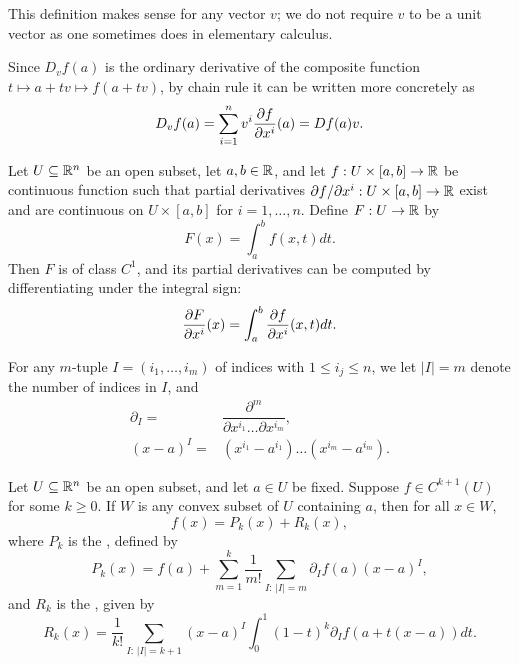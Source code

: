 \documentclass[11pt,a4paper]{article}
\begin{document}
\begin{remark}
This definition makes sense for any vector $v$; we do not require $v$ to be a unit vector as one sometimes does in elementary calculus.
\end{remark}

\begin{remark}
Since $D_vf(a)$ is the ordinary derivative of the composite function $t\mapsto a+tv\mapsto f(a+tv)$, by chain rule it can be written more concretely as
\begin{equation*}
D_vf(a) = \sum_{i=1}^n v^i \dfrac{\partial f}{\partial x^{i}}(a) = Df(a)v.
\end{equation*}
\end{remark}

\begin{proposition} \label{prop:fundamental_theorem_of_calculus}
Let $U\subseteq\mathbb{R}^n$ be an open subset, let $a,b\in \mathbb{R}$, and let $f:U\times[a,b]\rightarrow \mathbb{R}$ be continuous function such that partial derivatives $\partial f/\partial x^{i}:U\times[a,b]\rightarrow \mathbb{R}$ exist and are continuous on $U\times [a,b]$ for $i = 1,\ldots,n$. Define $F:U\rightarrow \mathbb{R}$ by
\begin{equation*}
F(x) = \int_{a}^b f(x,t)dt.
\end{equation*}
Then $F$ is of class $C^1$, and its partial derivatives can be computed by differentiating under the integral sign:
\begin{equation*}
\dfrac{\partial F}{\partial x^{i}}(x) = \int_a^b \dfrac{\partial f}{\partial x^{i}}(x,t) dt.
\end{equation*}
\end{proposition}

For any $m$-tuple $I = (i_1,\ldots,i_m)$ of indices with $1\le i_j\le n$, we let $|I| = m$ denote the number of indices in $I$, and
\begin{align*}
\partial_I =& \dfrac{\partial^m}{\partial x^{i_1}\ldots\partial x^{i_m}},\\
(x-a)^I =& (x^{i_1}-a^{i_1})\ldots(x^{i_m}-a^{i_m}).
\end{align*}

\begin{proposition}
Let $U\subseteq \mathbb{R}^n$ be an open subset, and let $a\in U$ be fixed. Suppose $f\in C^{k+1}(U)$ for some $k\ge 0$. If $W$ is any convex subset of $U$ containing $a$, then for all $x\in W$,
\begin{equation}\label{eqn:Taylor_expansion}
f(x) = P_k(x) + R_k(x),
\end{equation}
where $P_k$ is the , defined by
\begin{equation}\label{eqn:Taylor_polynomial}
P_k(x) = f(a) + \sum_{m = 1}^k \dfrac{1}{m!}\sum_{I:\,|I| = m}\partial_I f(a)(x-a)^I,
\end{equation}
and $R_k$ is the , given by 
\begin{equation}\label{eqn:Taylor_remainder}
R_k(x) = \dfrac{1}{k!}\sum_{I:\,|I| = k+1}(x-a)^I \int_0^1 (1-t)^k\partial_I f(a+t(x-a)) dt.
\end{equation}
\end{proposition}
\end{document}

